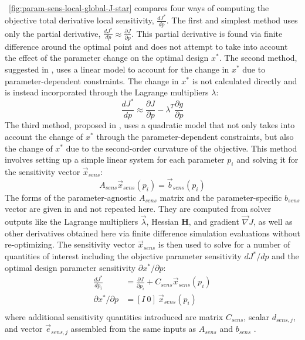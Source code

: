 \begin{appendices}
\figureautorefname~\ref{fig:param-sens-local-global-J-star} compares four ways of computing the objective total derivative local sensitivity, $\frac{dJ^*}{dp}$.
The first and simplest method uses only the partial derivative, $\frac{dJ^*}{dp}\approx \frac{\partial J}{\partial p}$.
This partial derivative is found via finite difference around the optimal point and does not attempt to take into account the effect of the parameter change on the optimal design $x^*$.
The second method, suggested in \cite{martins_engineering_2022}, uses a linear model to account for the change in $x^*$ due to parameter-dependent constraints.
The change in $x^*$ is not calculated directly and is instead incorporated through the Lagrange multipliers $\lambda$:
\begin{equation}
\frac{dJ^*}{dp} \approx \frac{\partial J}{\partial p} -  \lambda^T \frac{\partial g}{\partial p}
\end{equation}
The third method, proposed in \cite{sobieszczanski-sobieski_sensitivity_1982}, uses a quadratic model that not only takes into account the change of $x^*$ through the parameter-dependent constraints, but also the change of $x^*$ due to the second-order curvature of the objective.
This method involves setting up a simple linear system for each parameter $p_i$ and solving it for the sensitivity vector $\vec{x}_{sens}$:
\begin{equation}
    A_{sens} \vec{x}_{sens}(p_i) = \vec{b}_{sens}(p_i)
\end{equation}
The forms of the parameter-agnostic $A_{sens}$ matrix and the parameter-specific $b_{sens}$ vector are given in \cite{sobieszczanski-sobieski_sensitivity_1982} and not repeated here.
They are computed from solver outputs like the Lagrange multipliers $\vec{\lambda}$, Hessian $\mathbf{H}$, and gradient $\vec{\nabla} J$, as well as other derivatives %
obtained here via finite difference simulation evaluations %
without re-optimizing.
The sensitivity vector $\vec{x}_{sens}$ is then used to solve for a number of quantities of interest including the objective parameter sensitivity $dJ^*/dp$ and the optimal design parameter sensitivity $\partial x^*/\partial p$:%
\begin{equation}
\begin{aligned}
    \frac{dJ^*}{dp_i} &=  \frac{\partial J}{\partial p_i} + C_{sens}\vec{x}_{sens}(p_i) \\
    \partial x^*/\partial p &=  [I ~0] ~\vec{x}_{sens}(p_i) \\
\end{aligned}
\end{equation}
where additional sensitivity quantities introduced are matrix $C_{sens}$, scalar $d_{sens,j}$, and vector $\vec{e}_{sens,j}$ assembled from the same inputs as $A_{sens}$ and $b_{sens}$ \cite{sobieszczanski-sobieski_sensitivity_1982}.


\end{appendices}
